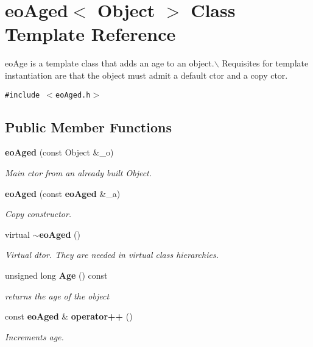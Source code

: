 \section{eo\-Aged$<$ Object $>$ Class Template Reference}
\label{classeo_aged}
eo\-Age is a template class that adds an age to an object.$\backslash$ Requisites for template instantiation are that the object must admit a default ctor and a copy ctor.  


{\tt \#include $<$eo\-Aged.h$>$}

\subsection*{Public Member Functions}
\begin{CompactItemize}
\item 
{\bf eo\-Aged} (const Object \&\_\-o)\label{classeo_aged_a0}

\begin{CompactList}\small\item\em Main ctor from an already built Object. \item\end{CompactList}\item 
{\bf eo\-Aged} (const {\bf eo\-Aged} \&\_\-a)\label{classeo_aged_a1}

\begin{CompactList}\small\item\em Copy constructor. \item\end{CompactList}\item 
virtual {\bf $\sim$eo\-Aged} ()\label{classeo_aged_a2}

\begin{CompactList}\small\item\em Virtual dtor. They are needed in virtual class hierarchies. \item\end{CompactList}\item 
unsigned long {\bf Age} () const \label{classeo_aged_a3}

\begin{CompactList}\small\item\em returns the age of the object \item\end{CompactList}\item 
const {\bf eo\-Aged} \& {\bf operator++} ()\label{classeo_aged_a4}

\begin{CompactList}\small\item\em Increments age. \item\end{CompactList}\end{CompactItemize}
